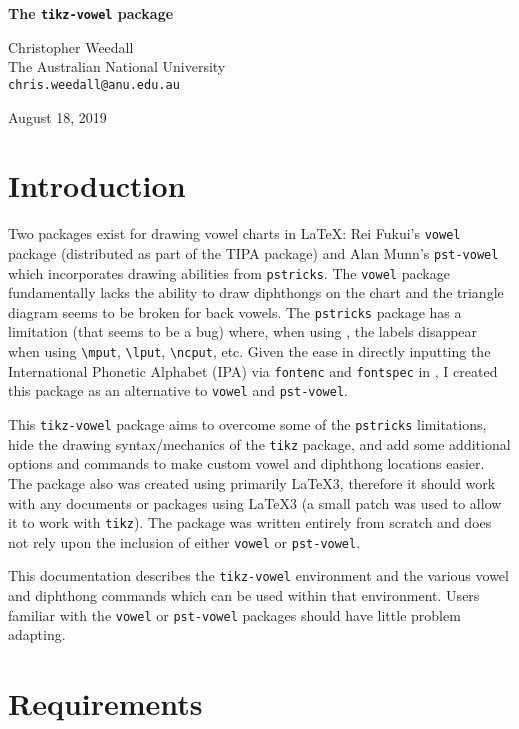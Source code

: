 \documentclass{article}
\newcommand{\pkg}[1]{\texttt{#1}}
\begin{document}
\begin{center}
{\Large\bfseries The \pkg{tikz-vowel} package}
\vspace{.5in}

\large Christopher Weedall\\The Australian National University\\\texttt{chris.weedall@anu.edu.au}

\bigskip
August 18, 2019
\end{center}

\section{Introduction}

Two packages exist for drawing vowel charts in \LaTeX: Rei Fukui's \pkg{vowel} package (distributed as part of the TIPA package) and Alan Munn's \pkg{pst-vowel} which incorporates drawing abilities from \pkg{pstricks}.  The \pkg{vowel} package fundamentally lacks the ability to draw diphthongs on the chart and the triangle diagram seems to be broken for back vowels.  The \pkg{pstricks} package has a limitation (that seems to be a bug) where, when using \XeLaTeX, the labels disappear when using \verb|\mput|, \verb|\lput|, \verb|\ncput|, etc.  Given the ease in directly inputting the International Phonetic Alphabet (IPA) via \pkg{fontenc} and \pkg{fontspec} in \XeLaTeX, I created this package as an alternative to \pkg{vowel} and \pkg{pst-vowel}.

This \pkg{tikz-vowel} package aims to overcome some of the \pkg{pstricks} limitations, hide the drawing syntax/mechanics of the \pkg{tikz} package, and add some additional options and commands to make custom vowel and diphthong locations easier.  The package also was created using primarily \LaTeX3, therefore it should work with any documents or packages using \LaTeX3 (a small patch was used to allow it to work with \pkg{tikz}).  The package was written entirely from scratch and does not rely upon the inclusion of either \pkg{vowel} or \pkg{pst-vowel}.

This documentation describes the \verb|tikz-vowel| environment and the various vowel and diphthong commands which can be used within that environment.  Users familiar with the \pkg{vowel} or \pkg{pst-vowel} packages should have little problem adapting.


\tableofcontents

\section{Requirements}
\label{sec:Requirements}
\end{document}
